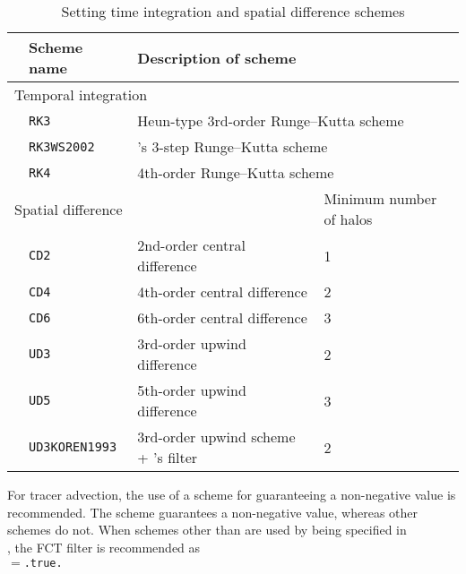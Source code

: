 \begin{table}[bth]
\begin{center}
  \caption{Setting time integration and spatial difference schemes}
  \label{tab:nml_atm_dyn}
  \begin{tabularx}{150mm}{llXX} \hline
    \rowcolor[gray]{0.9} & \multicolumn{1}{l}{Scheme name} & \multicolumn{1}{l}{Description of scheme} & \\ \hline
    \multicolumn{3}{l}{Temporal integration} &  \\ \hline
    & \multicolumn{1}{l}{\verb|RK3|} & \multicolumn{2}{l}{Heun-type 3rd-order Runge--Kutta scheme} \\
    & \multicolumn{1}{l}{\verb|RK3WS2002|} & \multicolumn{2}{l}{\citet{Wicker_2002}'s 3-step Runge--Kutta scheme} \\
    & \multicolumn{1}{l}{\verb|RK4|} & \multicolumn{2}{l}{4th-order Runge--Kutta scheme} \\
    \hline
    \multicolumn{3}{l}{Spatial difference} & Minimum number of halos\\ \hline
    & \multicolumn{1}{l}{\verb|CD2|} & \multicolumn{1}{l}{2nd-order central difference} & \multicolumn{1}{l}{1}\\
    & \multicolumn{1}{l}{\verb|CD4|} & \multicolumn{1}{l}{4th-order central difference} & \multicolumn{1}{l}{2}\\
    & \multicolumn{1}{l}{\verb|CD6|} & \multicolumn{1}{l}{6th-order central difference} & \multicolumn{1}{l}{3}\\
    & \multicolumn{1}{l}{\verb|UD3|} & \multicolumn{1}{l}{3rd-order upwind difference} & \multicolumn{1}{l}{2}\\
    & \multicolumn{1}{l}{\verb|UD5|} & \multicolumn{1}{l}{5th-order upwind difference} & \multicolumn{1}{l}{3}\\
    & \multicolumn{1}{l}{\verb|UD3KOREN1993|} & \multicolumn{1}{X}{3rd-order upwind scheme + \citet{Koren_1993}'s filter} & \multicolumn{1}{l}{2}\\
\hline
  \end{tabularx}
\end{center}
\end{table}

For tracer advection, the use of a scheme for guaranteeing a non-negative value is recommended. The  scheme guarantees a non-negative value, whereas other schemes do not. When schemes other than  are used by being specified in \\
, the FCT filter is recommended as \\
$=$\verb|.true.|

